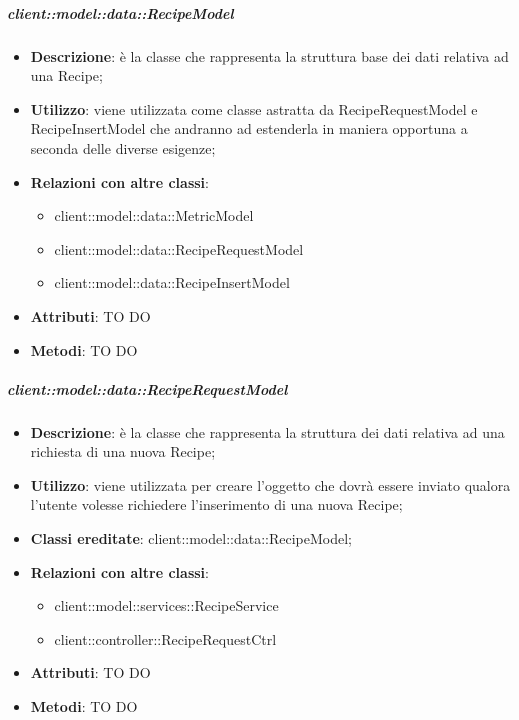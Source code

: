 		\subparagraph{client::model::data::RecipeModel} %
		\label{subp:client_model_data_recipe}
			\begin{itemize}
				\item \textbf{Descrizione}: è la classe che rappresenta la struttura base dei dati relativa ad una Recipe;
				\item \textbf{Utilizzo}: viene utilizzata come classe astratta da RecipeRequestModel e RecipeInsertModel che andranno ad estenderla in maniera opportuna a seconda delle diverse esigenze;
				\item \textbf{Relazioni con altre classi}:
					\begin{itemize}
						\item client::model::data::MetricModel
						\item client::model::data::RecipeRequestModel
						\item client::model::data::RecipeInsertModel
					\end{itemize}
				\item \textbf{Attributi}: TO DO
				\item \textbf{Metodi}: TO DO
			\end{itemize}


		\subparagraph{client::model::data::RecipeRequestModel} %
		\label{subp:client_model_data_reciperequestmodel}
			\begin{itemize}
				\item \textbf{Descrizione}: è la classe che rappresenta la struttura dei dati relativa ad una richiesta di una nuova Recipe;
				\item \textbf{Utilizzo}: viene utilizzata per creare l'oggetto che dovrà essere inviato qualora l'utente volesse richiedere l'inserimento di una nuova Recipe;
				\item \textbf{Classi ereditate}: client::model::data::RecipeModel;
				\item \textbf{Relazioni con altre classi}:
					\begin{itemize}
						\item client::model::services::RecipeService
						\item client::controller::RecipeRequestCtrl
					\end{itemize}
				\item \textbf{Attributi}: TO DO
				\item \textbf{Metodi}: TO DO
			\end{itemize}

